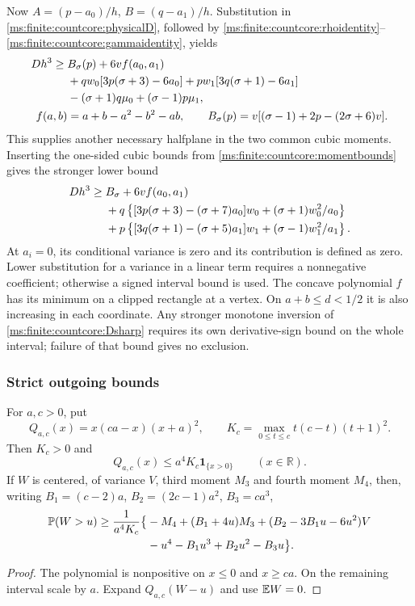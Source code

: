 Now \(A=(p-a_0)/h\), \(B=(q-a_1)/h\). Substitution in
\eqref{ms:finite:countcore:physicalD}, followed by
\eqref{ms:finite:countcore:rhoidentity}--\eqref{ms:finite:countcore:gammaidentity}, yields
\begin{align}
 Dh^3\ge{}&B_\sigma(p)+6v f(a_0,a_1)\notag\\
 &+qw_0[3p(\sigma+3)-6a_0]
   +pw_1[3q(\sigma+1)-6a_1]\notag\\
 &-(\sigma+1)q\mu_0+(\sigma-1)p\mu_1,
 \label{ms:finite:countcore:Dhalfplane}\\
 f(a,b)&=a+b-a^2-b^2-ab,\qquad
 B_\sigma(p)=v[(\sigma-1)+2p-(2\sigma+6)v].\notag
\end{align}
This supplies another necessary halfplane in the two common cubic moments.
Inserting the one-sided cubic bounds from
\eqref{ms:finite:countcore:momentbounds} gives the stronger lower bound
\begin{align}
 Dh^3\ge{}&B_\sigma+6vf(a_0,a_1)\notag\\
 &+q\left\{[3p(\sigma+3)-(\sigma+7)a_0]w_0
                    +(\sigma+1)w_0^2/a_0\right\}\notag\\
 &+p\left\{[3q(\sigma+1)-(\sigma+5)a_1]w_1
                    +(\sigma-1)w_1^2/a_1\right\}.
 \label{ms:finite:countcore:Dsharp}
\end{align}
At \(a_i=0\), its conditional variance is zero and its contribution is
defined as zero. Lower substitution for a variance in a linear term
requires a nonnegative coefficient; otherwise a signed interval bound is
used. The concave polynomial \(f\) has its minimum on a clipped rectangle
at a vertex. On \(a+b\le d<1/2\) it is also increasing in each
coordinate. Any stronger monotone inversion of
\eqref{ms:finite:countcore:Dsharp} requires its own derivative-sign bound on the
whole interval; failure of that bound gives no exclusion.

\subsubsection{Strict outgoing bounds}

\begin{lemma}
\label{ms:finite:countcore:quartic}
For \(a,c>0\), put
\[
 Q_{a,c}(x)=x(ca-x)(x+a)^2,
 \qquad K_c=\max_{0\le t\le c}t(c-t)(t+1)^2.
\]
Then \(K_c>0\) and
\[
 Q_{a,c}(x)\le a^4K_c\mathbf1_{\{x>0\}}\qquad(x\in\mathbb R).
\]
If \(W\) is centered, of variance \(V\), third moment \(M_3\) and
fourth moment \(M_4\), then, writing
\(B_1=(c-2)a\), \(B_2=(2c-1)a^2\), \(B_3=ca^3\),
\begin{align}
 \mathbb P(W>u)\ge\frac1{a^4K_c}\bigl\{
 &-M_4+(B_1+4u)M_3+(B_2-3B_1u-6u^2)V\notag\\
 &-u^4-B_1u^3+B_2u^2-B_3u\bigr\}.
 \label{ms:finite:countcore:outgoingquartic}
\end{align}
\end{lemma}
\begin{proof}
The polynomial is nonpositive on \(x\le0\) and \(x\ge ca\).
On the remaining interval scale by \(a\). Expand \(Q_{a,c}(W-u)\)
and use \(\mathbb E W=0\).
\end{proof}

